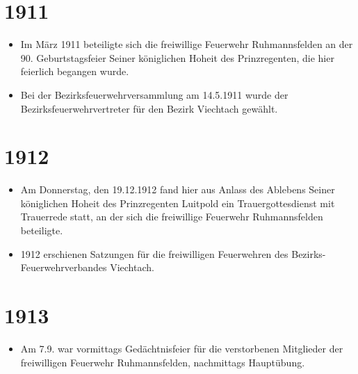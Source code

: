\documentclass[12pt,a4paper]{book}
\begin{document}
\section*{1911}

\begin{itemize}
\item Im März 1911 beteiligte sich die freiwillige Feuerwehr Ruhmannsfelden an
der 90. Geburtstagsfeier Seiner königlichen Hoheit des Prinzregenten, die hier
feierlich begangen wurde.

\item Bei der Bezirksfeuerwehrversammlung am 14.5.1911 wurde der
Bezirksfeuerwehrvertreter für den Bezirk Viechtach gewählt.
\end{itemize}

\section*{1912}

\begin{itemize}
\item Am Donnerstag, den 19.12.1912 fand hier aus Anlass des Ablebens Seiner
königlichen Hoheit des Prinzregenten Luitpold ein Trauergottesdienst mit
Trauerrede statt, an der sich die freiwillige Feuerwehr Ruhmannsfelden
beteiligte.

\item 1912 erschienen Satzungen für die freiwilligen Feuerwehren des
Bezirks-Feuerwehrverbandes Viechtach.
\end{itemize}

\section*{1913}

\begin{itemize}
\item Am 7.9. war vormittags Gedächtnisfeier für die verstorbenen Mitglieder der
freiwilligen Feuerwehr Ruhmannsfelden, nachmittags Hauptübung.
\end{itemize}
\end{document}
